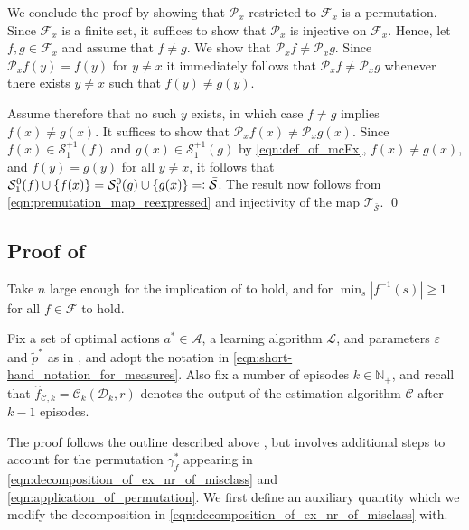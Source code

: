 \documentclass[11pt]{article}
\newcommand{\defeq}{=\vcentcolon}
\newcommand{\mcA}{\mathcal{A}}
\newcommand{\mcC}{\mathcal{C}}
\newcommand{\mcD}{\mathcal{D}}
\newcommand{\mcF}{\mathcal{F}}
\newcommand{\mcL}{\mathcal{L}}
\newcommand{\mcP}{\mathcal{P}}
\newcommand{\mcS}{\mathcal{S}}
\newcommand{\mcT}{\mathcal{T}}
\newcommand{\mbbN}{\mathbb{N}}
\theoremstyle{definition}
\theoremstyle{definition}
\begin{document}
We conclude the proof by showing that $\mcP_x$ restricted to $\mcF_x$ is a permutation.
Since $\mcF_x$ is a finite set, it suffices to show that $\mcP_x$ is injective on $\mcF_x$.
Hence, let $f,g\in\mcF_x$ and assume that $f\neq g$.
We show that $\mcP_xf\neq \mcP_xg$.
Since $\mcP_xf(y)=f(y)$ for $y\neq x$ it immediately follows that $\mcP_xf\neq \mcP_xg$ whenever there exists $y\neq x$ such that $f(y)\neq g(y)$.

Assume therefore that no such $y$ exists, in which case $f\neq g$ implies $f(x)\neq g(x)$.
It suffices to show that $\mcP_xf(x)\neq \mcP_xg(x)$.
Since $f(x)\in \mcS_1^{+1}(f)$ and $g(x)\in \mcS_1^{+1}(g)$ by \eqref{eqn:def_of_mcFx}, $f(x)\neq g(x)$, and $f(y)=g(y)$ for all $y\neq x$, it follows that $\mcS^{0}_1(f)\cup \{f(x)\}=\mcS^{0}_1(g)\cup \{g(x)\}\defeq \bar{\mcS}$.
The result now follows from \eqref{eqn:premutation_map_reexpressed} and injectivity of the map $\mcT_{\bar{\mcS}}$.
\qed

\subsection{Proof of \texorpdfstring{}{reduction to local misclassification probabilities}}
\label{sec:proof_of_reduction_to_local_misclassification_probability}

Take $n$ large enough for the implication of  to hold, and for $\min_{s}|f^{-1}(s)| \geq 1$ for all $f\in\mcF$ to hold.

Fix a set of optimal actions $a^*\in\mcA$, a learning algorithm $\mcL$, and parameters $\varepsilon$ and $\tilde{p}^*$ as in , and adopt the notation in \eqref{eqn:short-hand_notation_for_measures}.
Also fix a number of episodes $k\in\mbbN_+$, and recall that $\hat{f}_{\mcC,k}=\mcC_{k}(\mcD_{k},r)$ denotes the output of the estimation algorithm $\mcC$ after $k-1$ episodes.

The proof follows the outline described above , but involves additional steps to account for the permutation $\gamma^*_f$ appearing in \eqref{eqn:decomposition_of_ex_nr_of_misclass} and \eqref{eqn:application_of_permutation}.
We first define an auxiliary quantity which we modify the decomposition in \eqref{eqn:decomposition_of_ex_nr_of_misclass} with.
\end{document}
